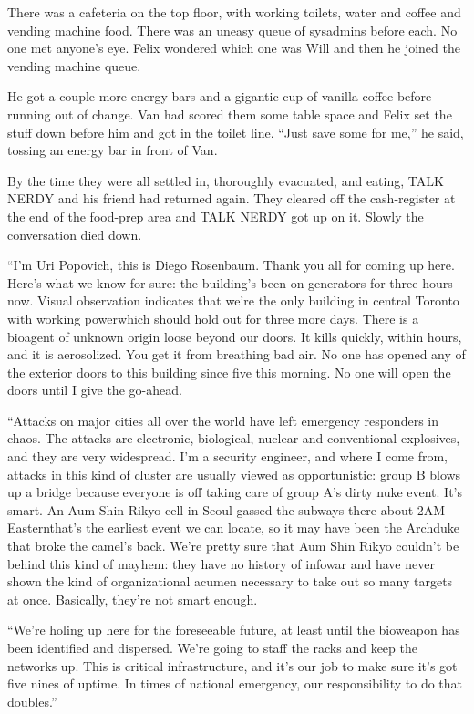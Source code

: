 There was a cafeteria on the top floor, with working toilets, water
and coffee and vending machine food. There was an uneasy queue of
sysadmins before each. No one met anyone’s eye. Felix wondered
which one was Will and then he joined the vending machine queue.

He got a couple more energy bars and a gigantic cup of vanilla
coffee before running out of change. Van had scored them some table
space and Felix set the stuff down before him and got in the toilet
line. “Just save some for me,” he said, tossing an energy bar in
front of Van.

By the time they were all settled in, thoroughly evacuated, and
eating, TALK NERDY and his friend had returned again. They cleared
off the cash-register at the end of the food-prep area and TALK
NERDY got up on it. Slowly the conversation died down.

“I’m Uri Popovich, this is Diego Rosenbaum. Thank you all for
coming up here. Here’s what we know for sure: the building’s been
on generators for three hours now. Visual observation indicates
that we’re the only building in central Toronto with working
power\dash{}which should hold out for three more days. There is a
bioagent of unknown origin loose beyond our doors. It kills
quickly, within hours, and it is aerosolized. You get it from
breathing bad air. No one has opened any of the exterior doors to
this building since five this morning. No one will open the doors
until I give the go-ahead.

“Attacks on major cities all over the world have left emergency
responders in chaos. The attacks are electronic, biological,
nuclear and conventional explosives, and they are very widespread.
I’m a security engineer, and where I come from, attacks in this
kind of cluster are usually viewed as opportunistic: group B blows
up a bridge because everyone is off taking care of group A’s dirty
nuke event. It’s smart. An Aum Shin Rikyo cell in Seoul gassed the
subways there about 2AM Eastern\dash{}that’s the earliest event we can
locate, so it may have been the Archduke that broke the camel’s
back. We’re pretty sure that Aum Shin Rikyo couldn’t be behind this
kind of mayhem: they have no history of infowar and have never
shown the kind of organizational acumen necessary to take out so
many targets at once. Basically, they’re not smart enough.

“We’re holing up here for the foreseeable future, at least until
the bioweapon has been identified and dispersed. We’re going to
staff the racks and keep the networks up. This is critical
infrastructure, and it’s our job to make sure it’s got five nines
of uptime. In times of national emergency, our responsibility to do
that doubles.”

